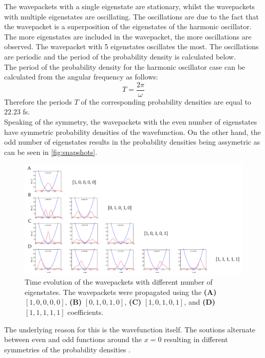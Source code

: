 \documentclass[12pt]{article}
\begin{document}
The wavepackets with a single eigenstate are stationary, whilst the wavepackets with multiple eigenstates are oscillating. The oscillations are due to the fact that the wavepacket is a superposition of the eigenstates of the harmonic oscillator. The more eigenstates are included in the wavepacket, the more oscillations are observed. The wavepacket with 5 eigenstates oscillates the most. The oscillations are periodic and the period of the probability density is calculated below. \\

The period of the probability density for the harmonic oscillator case can be calculated from the angular frequency as follows:
\begin{equation}
    T = \frac{2\pi}{\omega}
\label{eq:period}
\end{equation}
Therefore the periods $T$ of the corresponding probability densities are equal to $22.23$ fs. \\

Speaking of the symmetry, the wavepackets with the even number of eigenstates have symmetric probability densities of the wavefunction. On the other hand, the odd number of eigenstates results in the probability densities being assymetric as can be seen in \autoref{fig:snapshots}. \\

\begin{figure}
    \includegraphics[width=\textwidth]{snapshots.pdf}
    \caption{Time evolution of the wavepackets with different number of eigenstates. The wavepackets were propagated using the \textbf{(A)} $[1, 0, 0, 0, 0]$, \textbf{(B)} $[0, 1, 0, 1, 0]$, \textbf{(C)} $[1, 0, 1, 0, 1]$, and \textbf{(D)} $[1, 1, 1, 1, 1]$ coefficients.}
    \label{fig:snapshots}
\end{figure}
\clearpage

The underlying reason for this is the wavefunction itself. The soutions alternate between even and odd functions around the $x = 0$ resulting in different symmetries of the probability densities \citep{quant_harmonic_osc}. \\
\end{document}
